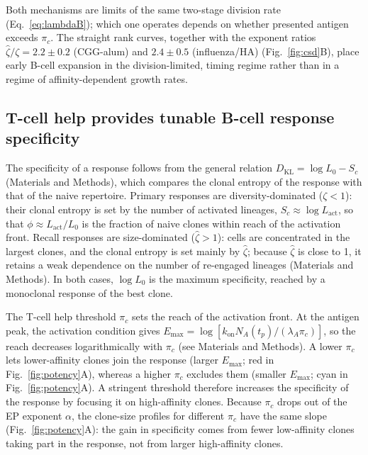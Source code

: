 \documentclass[aps, pre, twocolumn, 10pt, groupedaddress, superscriptaddress, linenumbers]{revtex4-2}
\newcommand{\on}{\text{on}}
\newcommand{\act}{\text{act}}
\newcommand{\DG}{E}
\newcommand{\lam}{\lambda}
\newcommand{\DKL}{D_{\mathrm{KL}}}
\begin{document}
{Both mechanisms are limits of the same two-stage division rate (Eq.~\ref{eq:lambdaB}); which one operates depends on whether presented antigen exceeds $\pi_c$.
The straight rank curves, together with the exponent ratios $\hat\zeta/\zeta = 2.2 \pm 0.2$ (CGG-alum) and $2.4 \pm 0.5$ (influenza/HA) (Fig.~\ref{fig:csd}B), place early B-cell expansion in the division-limited, timing regime rather than in a regime of affinity-dependent growth rates.


\subsection*{T-cell help provides tunable B-cell response specificity}
The specificity of a response follows from the general relation $\DKL = \log L_0 - S_c$ (Materials and Methods), which compares the clonal entropy of the response with that of the naive repertoire.
Primary responses are diversity-dominated ($\zeta < 1$): their clonal entropy is set by the number of activated lineages, $S_c \approx \log L_\act$, so that $\phi \approx L_\act/L_0$ is the fraction of naive clones within reach of the activation front.
Recall responses are size-dominated ($\hat\zeta > 1$): cells are concentrated in the largest clones, and the clonal entropy is set mainly by $\hat\zeta$; because $\hat\zeta$ is close to 1, it retains a weak dependence on the number of re-engaged lineages (Materials and Methods).
In both cases, $\log L_0$ is the maximum specificity, reached by a monoclonal response of the best clone.

The T-cell help threshold $\pi_c$ sets the reach of the activation front.
At the antigen peak, the activation condition gives $\DG_{\max} = \log[k_\on N_A(t_p)/(\lam_A \pi_c)]$, so the reach decreases logarithmically with $\pi_c$ (see Materials and Methods).
A lower $\pi_c$ lets lower-affinity clones join the response (larger $\DG_{\max}$; red in Fig.~\ref{fig:potency}A), whereas a higher $\pi_c$ excludes them (smaller $\DG_{\max}$; cyan in Fig.~\ref{fig:potency}A).
A stringent threshold therefore increases the specificity of the response by focusing it on high-affinity clones.
Because $\pi_c$ drops out of the EP exponent $\alpha$, the clone-size profiles for different $\pi_c$ have the same slope (Fig.~\ref{fig:potency}A): the gain in specificity comes from fewer low-affinity clones taking part in the response, not from larger high-affinity clones.

}
\end{document}
